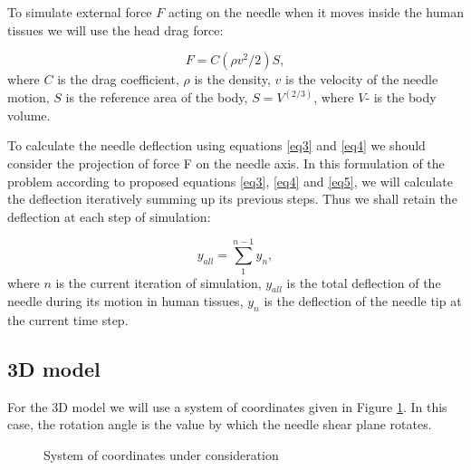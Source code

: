 \documentclass[a4paper]{jpconf}
\begin{document}
To simulate external force $F$ acting on the needle when it moves inside the human tissues we will use the head drag force:

\begin{equation} \label{eq5}
F = C (\rho v^2/2) S, 
\end{equation}
where  $C$  is the drag coefficient, $\rho$  is the density, $v$  is the velocity of the needle motion, $S$  is the reference area of the body, $S = V^{(2/3)}$, where $V$- is the body volume.

To calculate the needle deflection using equations \eqref{eq3} and \eqref{eq4} we should consider the projection of force F on the needle axis. In this formulation of the problem according to proposed equations \eqref{eq3}, \eqref{eq4} and \eqref{eq5}, we will calculate the deflection iteratively summing up its previous steps. Thus we shall retain the deflection at each step of simulation:

\begin{equation} \label{eq6}
y_{all} = \sum\limits_{1}^{n-1} y_{n},
\end{equation}
where $n$  is the current iteration of simulation, $y_{all}$  is the total deflection of the needle during its motion in human tissues, $y_{n}$  is the deflection of the needle tip at the current time step.

\subsection{3D model}

For the 3D model we will use a system of coordinates given in Figure  \ref{n2}. In this case, the rotation angle is the value by which the needle shear plane rotates.

\begin{figure}[h]
\caption{System of coordinates under consideration}
\label{n2}
\end{figure}
\end{document}
